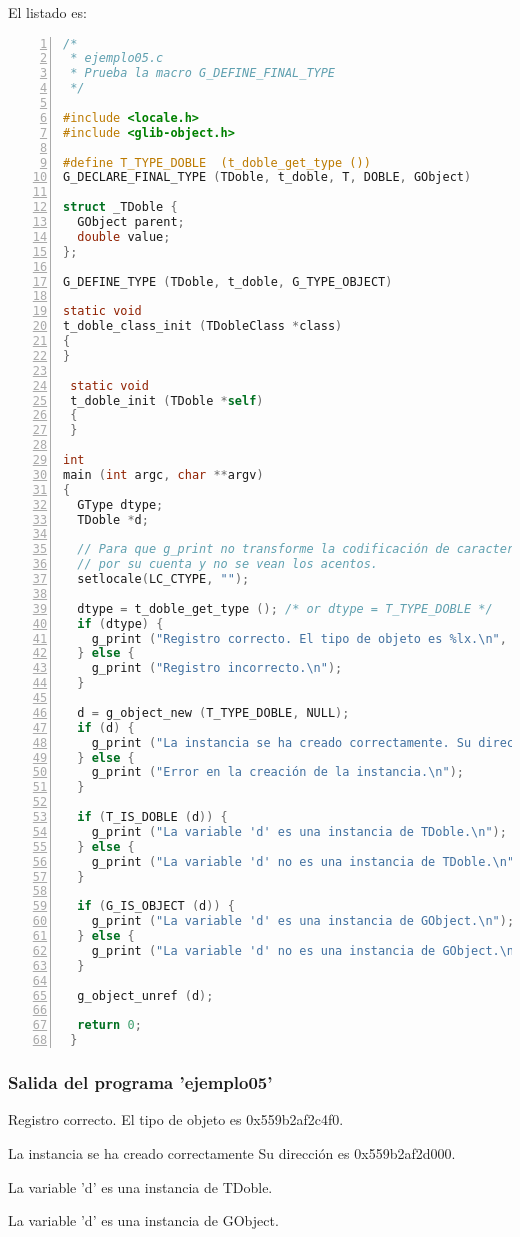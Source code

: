 El listado es:
\begin{lstlisting}[language=C, numbers=left]
/*
 * ejemplo05.c
 * Prueba la macro G_DEFINE_FINAL_TYPE
 */

#include <locale.h>
#include <glib-object.h>
 
#define T_TYPE_DOBLE  (t_doble_get_type ())
G_DECLARE_FINAL_TYPE (TDoble, t_doble, T, DOBLE, GObject)
 
struct _TDoble {
  GObject parent;
  double value;
};
 
G_DEFINE_TYPE (TDoble, t_doble, G_TYPE_OBJECT)
 
static void
t_doble_class_init (TDobleClass *class)
{
}
 
 static void
 t_doble_init (TDoble *self)
 {
 }
 
int
main (int argc, char **argv)
{
  GType dtype;
  TDoble *d;

  // Para que g_print no transforme la codificación de caracteres
  // por su cuenta y no se vean los acentos.
  setlocale(LC_CTYPE, "");
  
  dtype = t_doble_get_type (); /* or dtype = T_TYPE_DOBLE */
  if (dtype) {
    g_print ("Registro correcto. El tipo de objeto es %lx.\n", dtype);
  } else {
    g_print ("Registro incorrecto.\n");
  }
 
  d = g_object_new (T_TYPE_DOBLE, NULL);
  if (d) {
    g_print ("La instancia se ha creado correctamente. Su dirección es %p.\n", d);
  } else {
    g_print ("Error en la creación de la instancia.\n");
  }
 
  if (T_IS_DOBLE (d)) {
    g_print ("La variable 'd' es una instancia de TDoble.\n");
  } else {
    g_print ("La variable 'd' no es una instancia de TDoble.\n");
  }
 
  if (G_IS_OBJECT (d)) {
    g_print ("La variable 'd' es una instancia de GObject.\n");
  } else {
    g_print ("La variable 'd' no es una instancia de GObject.\n");
  }
  
  g_object_unref (d);
 
  return 0;
 }
\end{lstlisting}

 \subsubsection{Salida del programa 'ejemplo05'}
\textsf{Registro correcto. El tipo de objeto es 0x559b2af2c4f0.}\par
\textsf{La instancia se ha creado correctamente Su dirección es 0x559b2af2d000.}\par
\textsf{La variable 'd' es una instancia de TDoble.}\par
\textsf{La variable 'd' es una instancia de GObject.}\par

